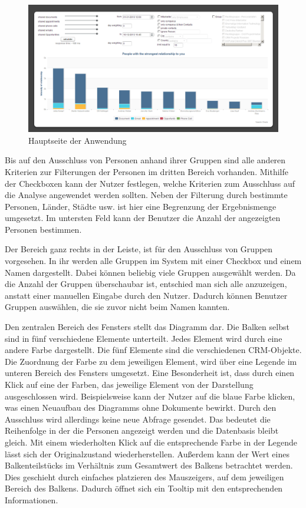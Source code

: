 \begin{figure}[htbp]
\centering
\includegraphics[width=\textwidth]{pics/final_screen.png}
\caption{Hauptseite der Anwendung}
\label{ergebniss_oberflaeche_haupt}
\end{figure}

Bis auf den Ausschluss von Personen anhand ihrer Gruppen sind alle anderen Kriterien zur Filterungen der Personen im dritten Bereich vorhanden. Mithilfe der Checkboxen kann der Nutzer festlegen, welche Kriterien zum Ausschluss auf die Analyse angewendet werden sollten. Neben der Filterung durch bestimmte Personen, Länder, Städte usw. ist hier eine Begrenzung der Ergebnismenge umgesetzt. Im untersten Feld kann der Benutzer die Anzahl der angezeigten Personen bestimmen.

Der Bereich ganz rechts in der Leiste, ist für den Ausschluss von Gruppen vorgesehen. In ihr werden alle Gruppen im System mit einer Checkbox und einem Namen dargestellt. Dabei können beliebig viele Gruppen ausgewählt werden. Da die Anzahl der Gruppen überschaubar ist, entschied man sich alle anzuzeigen, anstatt einer manuellen Eingabe durch den Nutzer. Dadurch können Benutzer Gruppen auswählen, die sie zuvor nicht beim Namen kannten.

Den zentralen Bereich des Fensters stellt das Diagramm dar. Die Balken selbst sind in fünf verschiedene Elemente unterteilt. Jedes Element wird durch eine andere Farbe dargestellt. Die fünf Elemente sind die verschiedenen CRM-Objekte. Die Zuordnung der Farbe zu dem jeweiligen Element, wird über eine Legende im unteren Bereich des Fensters umgesetzt. Eine Besonderheit ist, dass durch einen Klick auf eine der Farben, das jeweilige Element von der Darstellung ausgeschlossen wird. Beispielsweise kann der Nutzer auf die blaue Farbe klicken, was einen Neuaufbau des Diagramms ohne Dokumente bewirkt. Durch den Ausschluss wird allerdings keine neue Abfrage gesendet. Das  bedeutet die Reihenfolge in der die Personen angezeigt werden und die Datenbasis bleibt gleich. Mit einem wiederholten Klick auf die entsprechende Farbe in der Legende lässt sich der Originalzustand wiederherstellen. Außerdem kann der Wert eines Balkenteilstücks im Verhältnis zum Gesamtwert des Balkens betrachtet werden. Dies geschieht durch einfaches platzieren des Mauszeigers, auf dem jeweiligen Bereich des Balkens. Dadurch öffnet sich ein Tooltip mit den entsprechenden Informationen.

